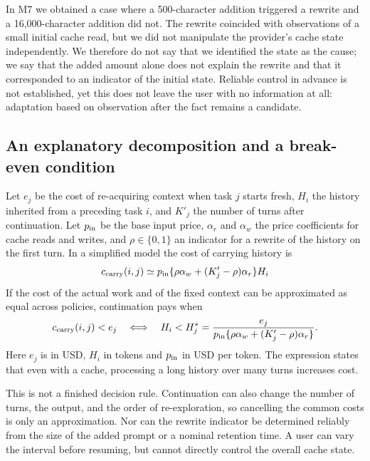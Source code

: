 \documentclass[a4paper,11pt]{article}
\begin{document}
In M7 we obtained a case where a 500-character addition triggered a rewrite and a 16{,}000-character addition did not. The rewrite coincided with observations of a small initial cache read, but we did not manipulate the provider's cache state independently. We therefore do not say that we identified the state as the cause; we say that the added amount alone does not explain the rewrite and that it corresponded to an indicator of the initial state. Reliable control in advance is not established, yet this does not leave the user with no information at all: adaptation based on observation after the fact remains a candidate.

\subsection{An explanatory decomposition and a break-even condition}
Let $e_j$ be the cost of re-acquiring context when task $j$ starts fresh, $H_i$ the history inherited from a preceding task $i$, and $K'_j$ the number of turns after continuation. Let $p_{\rm in}$ be the base input price, $\alpha_r$ and $\alpha_w$ the price coefficients for cache reads and writes, and $\rho\in\{0,1\}$ an indicator for a rewrite of the history on the first turn. In a simplified model the cost of carrying history is
\begin{equation}
c_{\rm carry}(i,j)\simeq p_{\rm in}\{\rho\alpha_w+(K'_j-\rho)\alpha_r\}H_i
\label{eq:carry}
\end{equation}
If the cost of the actual work and of the fixed context can be approximated as equal across policies, continuation pays when
\begin{equation}
c_{\rm carry}(i,j)<e_j
\quad\Longleftrightarrow\quad
H_i<H^*_j=\frac{e_j}{p_{\rm in}\{\rho\alpha_w+(K'_j-\rho)\alpha_r\}}.
\label{eq:breakeven}
\end{equation}
Here $e_j$ is in USD, $H_i$ in tokens and $p_{\rm in}$ in USD per token. The expression states that even with a cache, processing a long history over many turns increases cost.

This is not a finished decision rule. Continuation can also change the number of turns, the output, and the order of re-exploration, so cancelling the common costs is only an approximation. Nor can the rewrite indicator be determined reliably from the size of the added prompt or a nominal retention time. A user can vary the interval before resuming, but cannot directly control the overall cache state.
\end{document}
